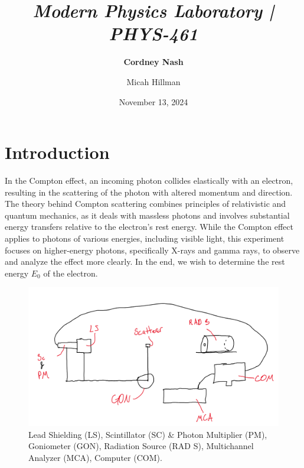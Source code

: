 \documentclass[a4paper,12pt,english]{all-in-one} %
\title{{\large\textit{Modern Physics Laboratory | PHYS-461}}\\[0.5cm]{\Huge\color{gray}\textsc{\@docsubtitle}}}
\author{\textbf{Cordney Nash}  \and Micah Hillman  }
\date{November 13, 2024}
\begin{document}
\begin{titlepage}
\maketitle\vfill
\end{titlepage}
\newpage


\section*{Introduction}
{
In the Compton effect, an incoming photon collides elastically with an electron, resulting in the scattering of the photon with altered momentum and direction. The theory behind Compton scattering combines principles of relativistic and quantum mechanics, as it deals with massless photons and involves substantial energy transfers relative to the electron’s rest energy. While the Compton effect applies to photons of various energies, including visible light, this experiment focuses on higher-energy photons, specifically X-rays and gamma rays, to observe and analyze the effect more clearly. In the end, we wish to determine the rest energy $E_0$ of the electron.
}

\begin{figure}[tbh]
    \centering
    \includegraphics[width=0.8\linewidth]{6-compton/images/Screenshot from 2024-11-16 17-29-02.png}
    \caption{ \scriptsize{ Lead Shielding (LS), Scintillator (SC) \& Photon Multiplier (PM), Goniometer (GON), Radiation Source (RAD S), Multichannel Analyzer (MCA), Computer (COM).
    }}
    \label{fig:compton-diagram}
\end{figure}
\end{document}
